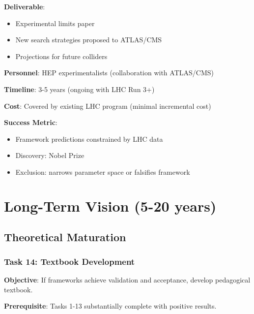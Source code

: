 \textbf{Deliverable}:
\begin{itemize}
    \item Experimental limits paper
    \item New search strategies proposed to ATLAS/CMS
    \item Projections for future colliders
\end{itemize}

\textbf{Personnel}: HEP experimentalists (collaboration with ATLAS/CMS)

\textbf{Timeline}: 3-5 years (ongoing with LHC Run 3+)

\textbf{Cost}: Covered by existing LHC program (minimal incremental cost)

\textbf{Success Metric}:
\begin{itemize}
    \item Framework predictions constrained by LHC data
    \item Discovery: Nobel Prize
    \item Exclusion: narrows parameter space or falsifies framework
\end{itemize}

\section{Long-Term Vision (5-20 years)}

\subsection{Theoretical Maturation}

\subsubsection{Task 14: Textbook Development}

\textbf{Objective}: If frameworks achieve validation and acceptance, develop pedagogical textbook.

\textbf{Prerequisite}: Tasks 1-13 substantially complete with positive results.

